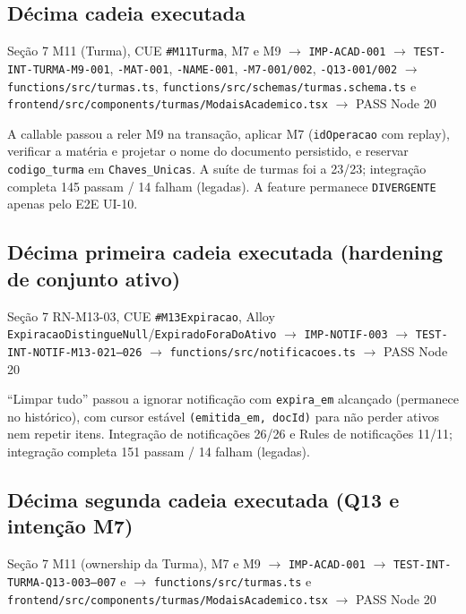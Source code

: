 \subsection{Décima cadeia executada}

\begin{center}
Seção 7 M11 (Turma), CUE \texttt{\#M11Turma}, M7 e M9
$\rightarrow$ \texttt{IMP-ACAD-001}
$\rightarrow$ \texttt{TEST-INT-TURMA-M9-001}, \texttt{-MAT-001}, \texttt{-NAME-001}, \texttt{-M7-001/002}, \texttt{-Q13-001/002}
$\rightarrow$ \nolinkurl{functions/src/turmas.ts}, \nolinkurl{functions/src/schemas/turmas.schema.ts} e \nolinkurl{frontend/src/components/turmas/ModaisAcademico.tsx}
$\rightarrow$ PASS Node 20
\end{center}

A callable passou a reler M9 na transação, aplicar M7 (\texttt{idOperacao} com
replay), verificar a matéria e projetar o nome do documento persistido, e
reservar \texttt{codigo\_turma} em \texttt{Chaves\_Unicas}. A suíte de turmas
foi a 23/23; integração completa 145 passam / 14 falham (legadas). A feature
permanece \texttt{DIVERGENTE} apenas pelo E2E UI-10.

\subsection{Décima primeira cadeia executada (hardening de conjunto ativo)}

\begin{center}
Seção 7 RN-M13-03, CUE \texttt{\#M13Expiracao}, Alloy \texttt{ExpiracaoDistingueNull}/\texttt{ExpiradoForaDoAtivo}
$\rightarrow$ \texttt{IMP-NOTIF-003}
$\rightarrow$ \texttt{TEST-INT-NOTIF-M13-021--026}
$\rightarrow$ \nolinkurl{functions/src/notificacoes.ts}
$\rightarrow$ PASS Node 20
\end{center}

``Limpar tudo'' passou a ignorar notificação com \texttt{expira\_em} alcançado
(permanece no histórico), com cursor estável \texttt{(emitida\_em, docId)} para
não perder ativos nem repetir itens. Integração de notificações 26/26 e Rules
de notificações 11/11; integração completa 151 passam / 14 falham (legadas).

\subsection{Décima segunda cadeia executada (Q13 e intenção M7)}

\begin{center}
Seção 7 M11 (ownership da Turma), M7 e M9
$\rightarrow$ \texttt{IMP-ACAD-001}
$\rightarrow$ \texttt{TEST-INT-TURMA-Q13-003--007} e 
$\rightarrow$ \nolinkurl{functions/src/turmas.ts} e \nolinkurl{frontend/src/components/turmas/ModaisAcademico.tsx}
$\rightarrow$ PASS Node 20
\end{center}

